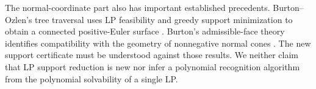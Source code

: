 The normal-coordinate part also has important established precedents.
Burton--Ozlen's tree traversal uses LP feasibility and greedy support
minimization to obtain a connected positive-Euler surface
\cite{BurtonOzlen}. Burton's admissible-face theory identifies compatibility
with the geometry of nonnegative normal cones \cite{BurtonFaces}. The new
support certificate must be understood against those results. We neither
claim that LP support reduction is new nor infer a polynomial recognition
algorithm from the polynomial solvability of a single LP.
